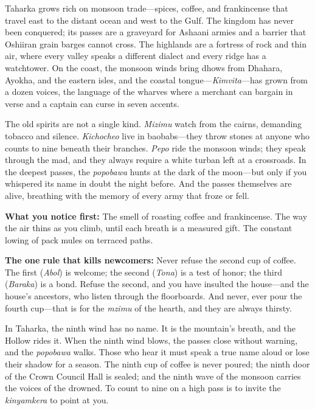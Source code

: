 \vspace{2mm}
\begin{tcolorbox}[colback=black!3,colframe=blue!60!black,title={Theme \& Atmosphere},breakable]
Taharka grows rich on monsoon trade---spices, coffee, and frankincense that travel east to the distant ocean and west to the Gulf. The kingdom has never been conquered; its passes are a graveyard for Ashaani armies and a barrier that Oshiiran grain barges cannot cross. The highlands are a fortress of rock and thin air, where every valley speaks a different dialect and every ridge has a watchtower. On the coast, the monsoon winds bring dhows from Dhahara, Ayokha, and the eastern isles, and the coastal tongue---\textit{Kimvita}---has grown from a dozen voices, the language of the wharves where a merchant can bargain in verse and a captain can curse in seven accents.

The old spirits are not a single kind. \textit{Mizimu} watch from the cairns, demanding tobacco and silence. \textit{Kichocheo} live in baobabs---they throw stones at anyone who counts to nine beneath their branches. \textit{Pepo} ride the monsoon winds; they speak through the mad, and they always require a white turban left at a crossroads. In the deepest passes, the \textit{popobawa} hunts at the dark of the moon---but only if you whispered its name in doubt the night before. And the passes themselves are alive, breathing with the memory of every army that froze or fell.

\vspace{2mm}
\textbf{What you notice first:} The smell of roasting coffee and frankincense. The way the air thins as you climb, until each breath is a measured gift. The constant lowing of pack mules on terraced paths.

\textbf{The one rule that kills newcomers:} Never refuse the second cup of coffee. The first (\textit{Abol}) is welcome; the second (\textit{Tona}) is a test of honor; the third (\textit{Baraka}) is a bond. Refuse the second, and you have insulted the house---and the house's ancestors, who listen through the floorboards. And never, ever pour the fourth cup---that is for the \textit{mzimu} of the hearth, and they are always thirsty.
\end{tcolorbox}

\begin{tcolorbox}[colback=black!3,colframe=red!60!black,title={The Ninth Taboo Manifestation},breakable]
In Taharka, the ninth wind has no name. It is the mountain's breath, and the Hollow rides it. When the ninth wind blows, the passes close without warning, and the \textit{popobawa} walks. Those who hear it must speak a true name aloud or lose their shadow for a season. The ninth cup of coffee is never poured; the ninth door of the Crown Council Hall is sealed; and the ninth wave of the monsoon carries the voices of the drowned. To count to nine on a high pass is to invite the \textit{kinyamkera} to point at you.
\end{tcolorbox}

